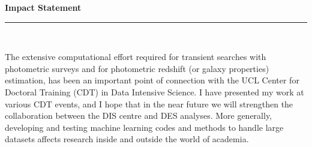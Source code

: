 
\newpage
\thispagestyle{empty}
\begin{raggedleft}
\vspace*{23mm}
\hfill {\huge {\bf {Impact Statement}}} \\
\vspace{6mm}
\hfill \rule{4in}{.015in} \\
\vspace{19mm}
\end{raggedleft}


The extensive computational effort required for transient searches with photometric surveys and for photometric redshift (or galaxy properties) estimation, has been an important point of connection with the UCL Center for Doctoral Training (CDT) in Data Intensive Science. I have presented my work at various CDT events, and I hope that in the near future we will strengthen the collaboration between the DIS centre and DES analyses. More generally, developing and testing machine learning codes and methods to handle large datasets affects research inside and outside the world of academia.








